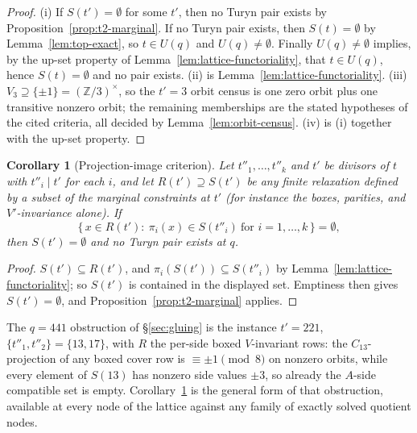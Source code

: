 \documentclass[11pt]{article}
\theoremstyle{plain}
\newtheorem{corollary}[theorem]{Corollary}
\theoremstyle{definition}
\theoremstyle{remark}
\newcommand{\Z}{\mathbb Z}
\begin{document}
\begin{proof}
(i) If $S(t')=\emptyset$ for some $t'$, then no Turyn pair exists by
Proposition~\ref{prop:t2-marginal}.  If no Turyn pair exists, then
$S(t)=\emptyset$ by Lemma~\ref{lem:top-exact}, so $t\in U(q)$ and
$U(q)\ne\emptyset$.  Finally $U(q)\ne\emptyset$ implies, by the up-set
property of Lemma~\ref{lem:lattice-functoriality}, that $t\in U(q)$, hence
$S(t)=\emptyset$ and no pair exists.  (ii) is
Lemma~\ref{lem:lattice-functoriality}.  (iii) $V_3\supseteq\{\pm1\}=
(\Z/3)^\times$, so the $t'=3$ orbit census is one zero orbit plus one
transitive nonzero orbit; the remaining memberships are the stated
hypotheses of the cited criteria, all decided by
Lemma~\ref{lem:orbit-census}.  (iv) is (i) together with the up-set
property.
\end{proof}

\begin{corollary}[Projection-image criterion]\label{cor:projection-image}
Let $t''_1,\dots,t''_k$ and $t'$ be divisors of $t$ with $t''_i\mid t'$ for
each $i$, and let $R(t')\supseteq S(t')$ be any finite relaxation defined by
a subset of the marginal constraints at $t'$ (for instance the boxes,
parities, and $V'$-invariance alone).  If
\[
  \bigl\{\,x\in R(t'):\ \pi_i(x)\in S(t''_i)\ \text{for }i=1,\dots,k\,\bigr\}
  =\emptyset,
\]
then $S(t')=\emptyset$ and no Turyn pair exists at $q$.
\end{corollary}

\begin{proof}
$S(t')\subseteq R(t')$, and $\pi_i(S(t'))\subseteq S(t''_i)$ by
Lemma~\ref{lem:lattice-functoriality}; so $S(t')$ is contained in the
displayed set.  Emptiness then gives $S(t')=\emptyset$, and
Proposition~\ref{prop:t2-marginal} applies.
\end{proof}

The $q=441$ obstruction of \S\ref{sec:gluing} is the instance
$t'=221$, $\{t''_1,t''_2\}=\{13,17\}$, with $R$ the per-side boxed
$V$-invariant rows: the $C_{13}$-projection of any boxed cover row is
$\equiv\pm1\pmod 8$ on nonzero orbits, while every element of $S(13)$ has
nonzero side values $\pm3$, so already the $A$-side compatible set is
empty.  Corollary~\ref{cor:projection-image} is the general form of that
obstruction, available at every node of the lattice against any family of
exactly solved quotient nodes.
\end{document}
